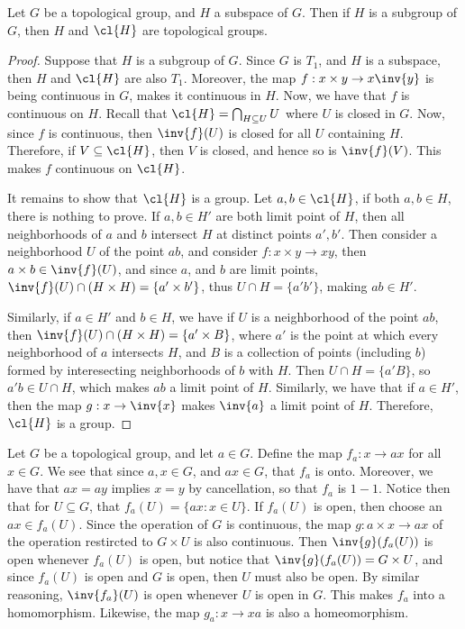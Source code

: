 \begin{lemma}\label{2.5.4}
    Let $G$ be a topological group, and $H$ a subspace of $G$. Then if $H$ is a
    subgroup of  $G$, then  $H$ and  $\cl{H}$ are topological groups.
\end{lemma}
\begin{proof}
    Suppose that $H$ is a subgroup of  $G$. Since  $G$ is  $T_1$, and $H$ is a
    subspace, then  $H$ and  $\cl{H}$ are also $T_1$. Moreover, the map $f:x
    \times y \rightarrow x\inv{y}$ is being continuous in $G$, makes it
    continuous in  $H$. Now, we have that $f$ is continuous on $H$. Recall that
    $\cl{H}=\bigcap_{H \subseteq U}{U}$ where $U$ is closed in  $G$. Now, since
     $f$ is continuous, then  $\inv{f}(U)$ is closed for all $U$ containing $H$.
     Therefore, if $V \subseteq \cl{H}$, then $V$ is closed, and hence so is
     $\inv{f}(V)$. This makes $f$ continuous on  $\cl{H}$.

     It remains to show that $\cl{H}$ is a group. Let $a,b \in \cl{H}$, if both
     $a,b \in H$, there is nothing to prove. If  $a,b \in H'$ are both limit
     point of $H$, then all neighborhoods of $a$ and $b$ intersect $H$ at
     distinct points $a',b'$. Then consider a neighborhood $U$ of the point
     $ab$, and consider  $f:x \times y \rightarrow xy$, then $a \times b \in
     \inv{f}(U)$, and since $a$, and  $b$ are limit points, $\inv{f}(U) \cap (H
     \times H)=\{a' \times b'\}$, thus $U \cap H=\{a'b'\}$, making $ab \in H'$.

     Similarly, if  $a \in H'$ and  $b \in H$, we have if $U$ is a neighborhood
     of the point $ab$, then $\inv{f}(U) \cap (H \times H)=\{a' \times B\}$,
     where $a'$ is the point at which every neighborhood of $a$ intersects $H$,
     and $B$ is a collection of points (including $b$) formed by
     interesecting neighborhoods of $b$ with  $H$. Then  $U \cap H=\{a'B\}$, so
     $a'b \in U \cap H$, which makes  $ab$ a limit point of  $H$. Similarly, we
     have that if $a \in H'$, then the map  $g:x \rightarrow \inv{x}$ makes
     $\inv{a}$ a limit point of $H$. Therefore,  $\cl{H}$ is a group.
\end{proof}

\begin{example}\label{2.10}
    Let $G$ be a topological group, and let  $a \in G$. Define the map
    $f_a:x \rightarrow ax$ for all $x \in G$. We see that since $a, x \in G$,
    and $ax \in G$, that $f_a$ is onto. Moreover, we have that  $ax=ay$ implies
    $x=y$ by cancellation, so that $f_a$ is  $1-1$. Notice then that for
    $U \subseteq G$, that $f_a(U)=\{ax : x \in U\}$. If $f_a(U)$ is open, then
    choose an $ax \in f_a(U)$. Since the operation of $G$ is continuous, the map
     $g:a \times x \rightarrow ax$ of the operation restircted to $G \times U$
     is also continuous. Then  $\inv{g}(f_a(U))$ is open whenever $f_a(U)$ is
     open, but notice that $\inv{g}(f_a(U))=G \times U$, and since $f_a(U)$ is
     open and $G$ is open, then  $U$ must also be open. By similar reasoning,
     $\inv{f_a}(U)$ is open whenever $U$ is open in  $G$. This makes  $f_a$ into
     a homomorphism. Likewise, the map  $g_a:x \rightarrow xa$ is also a
     homeomorphism.
\end{example}

